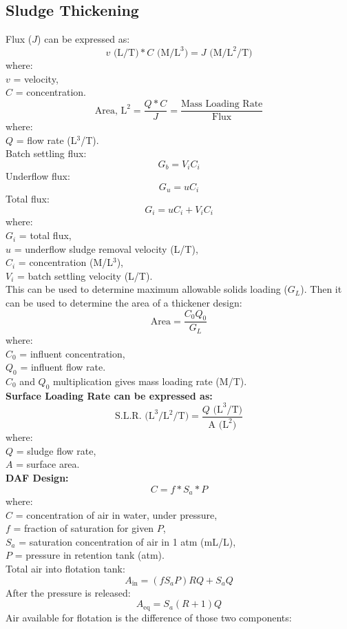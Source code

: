 \documentclass[a4paper, landscape, 8pt]{extarticle}
\begin{document}
\begin{multicols}{4}
\section*{Sludge Thickening}
Flux ($J$) can be expressed as:
\[
v\text{ (L/T)} * C\text{ (M/L}^3\text{)} = J\text{ (M/L}^2/\text{T)}
\]
where:\\
$v$ = velocity,\\
$C$ = concentration.
\[
\text{Area, L}^2 = \frac{Q*C}{J} =\frac{\text{Mass Loading Rate}}{\text{Flux}}
\]
where:\\
$Q$ = flow rate (L$^3$/T).\\
Batch settling flux:
\[
G_b = V_iC_i
\]
Underflow flux:
\[
G_u = uC_i
\]
Total flux:
\[
G_i = uC_i + V_iC_i
\]
where:\\
$G_i$ = total flux,\\
$u$ = underflow sludge removal velocity (L/T),\\
$C_i$ = concentration (M/L$^3$),\\
$V_i$ = batch settling velocity (L/T).\\
This can be used to determine maximum allowable solids loading ($G_L$). Then it can be used to determine the area of a thickener design:
\[
\text{Area} = \frac{C_0Q_0}{G_L} 
\]
where:\\
$C_0$ = influent concentration,\\
$Q_0$ = influent flow rate.\\
$C_0$ and $Q_0$ multiplication gives mass loading rate (M/T).\\
\textbf{Surface Loading Rate can be expressed as:}
\[
\text {S.L.R.} \text{ (L}^3/\text{L}^2/\text{T)} = \frac{Q\text{ (L}^3\text{/T)}}{\text{A (L}^2\text{)}} 
\]
where:\\
$Q$ = sludge flow rate,\\
$A$ = surface area.\\
\textbf{DAF Design:}
\[
C = f * S_a * P
\]
where:\\
$C$ = concentration of air in water, under pressure,\\
$f$ = fraction of saturation for given $P$,\\
$S_a$ = saturation concentration of air in 1 atm (mL/L),\\
$P$ = pressure in retention tank (atm).\\
Total air into flotation tank:
\[
A_{\text{in}} = (fS_aP)RQ+S_aQ
\]
After the pressure is released:
\[
A_{\text{eq}} = S_a(R+1)Q
\]
Air available for flotation is the difference of those two components:
\begin{equation}

\end{equation}
\end{multicols}
\end{document}
